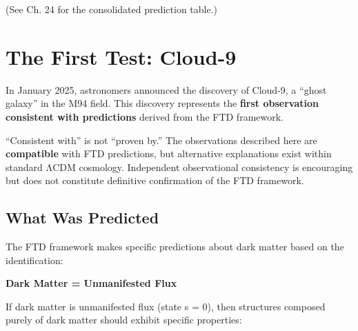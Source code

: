 \documentclass[
  11pt,
  letterpaper,
  twoside,
  openany]{book}
\makeatletter
\let\orig@section\section
\renewcommand{\section}{\needspace{8\baselineskip}\orig@section}
\let\orig@subsection\subsection
\renewcommand{\subsection}{\needspace{6\baselineskip}\orig@subsection}
\makeatother
\begin{document}
(See Ch. 24 for the consolidated prediction table.)

\section{The First Test: Cloud-9}\label{sec-cloud9}

In January 2025, astronomers announced the discovery of Cloud-9, a
``ghost galaxy'' in the M94 field. This discovery represents the
\textbf{first observation consistent with predictions} derived from the
FTD framework.

\begin{tcolorbox}[enhanced jigsaw, colbacktitle=quarto-callout-warning-color!10!white, titlerule=0mm, bottomtitle=1mm, bottomrule=.15mm, colback=white, arc=.35mm, breakable, toprule=.15mm, title=\textcolor{quarto-callout-warning-color}{\faExclamationTriangle}\hspace{0.5em}{Epistemic Caution}, rightrule=.15mm, coltitle=black, leftrule=.75mm, colframe=quarto-callout-warning-color-frame, toptitle=1mm, opacityback=0, opacitybacktitle=0.6, left=2mm]

``Consistent with'' is not ``proven by.'' The observations described
here are \textbf{compatible} with FTD predictions, but alternative
explanations exist within standard ΛCDM cosmology. Independent
observational consistency is encouraging but does not constitute
definitive confirmation of the FTD framework.

\end{tcolorbox}

\subsection{What Was Predicted}\label{what-was-predicted}

The FTD framework makes specific predictions about dark matter based on
the identification:

\textbf{Dark Matter = Unmanifested Flux}

If dark matter is unmanifested flux (state s = 0), then structures
composed purely of dark matter should exhibit specific properties:
\end{document}
